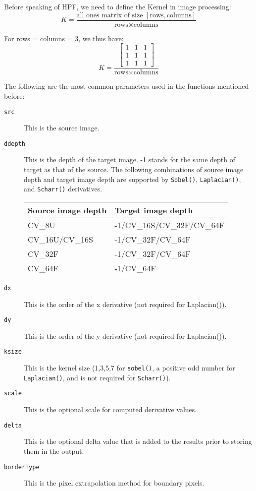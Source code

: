 \documentclass{labo}
\begin{document}
Before speaking of HPF, we need to define the Kernel in image processing:
\[K = \frac{\text{all ones matrix of size }[\text{rows}, \text{columns}]}{\text{rows} \times \text{columns}} \]

For rows = columns = 3, we thus have:
\[K = \frac{
\begin{bmatrix}
1 & 1 & 1\\
1 & 1 & 1\\
1 & 1 & 1
\end{bmatrix}
}{\text{rows} \times \text{columns}} \]

The following are the most common parameters used in the functions mentioned before:

\begin{description}
	\item[\texttt{src}] This is the source image. 
	
	\item[\texttt{ddepth}] This is the depth of the target image. -1 stands for the same depth of target as that of the source. The following combinations of source image depth and target image depth are supported by \texttt{Sobel()}, \texttt{Laplacian()}, and \texttt{Scharr()} derivatives.
	\begin{center}
	\begin{tabular}{ll}\toprule
	Source image depth & Target image depth\\
	\midrule
	CV\_8U & -1/CV\_16S/CV\_32F/CV\_64F \\
	CV\_16U/CV\_16S & -1/CV\_32F/CV\_64F \\
	CV\_32F & -1/CV\_32F/CV\_64F \\
	CV\_64F & -1/CV\_64F \\
	\bottomrule
	\end{tabular}
	\end{center}
	\item[\texttt{dx}] This is the order of the x derivative (not required for Laplacian()).
	\item[\texttt{dy}] This is the order of the y derivative (not required for Laplacian()).
	\item[\texttt{ksize}] This is the kernel size (1,3,5,7 for \texttt{sobel()}, a positive odd number for \texttt{Laplacian()}, and is not required for \texttt{Scharr()}).
	\item[\texttt{scale}] This is the optional scale for computed derivative values.
	\item[\texttt{delta}] This is the optional delta value that is added to the results prior to storing them in the output.
	\item[\texttt{borderType}] This is the pixel extrapolation method for boundary pixels.
\end{description}
\end{document}
